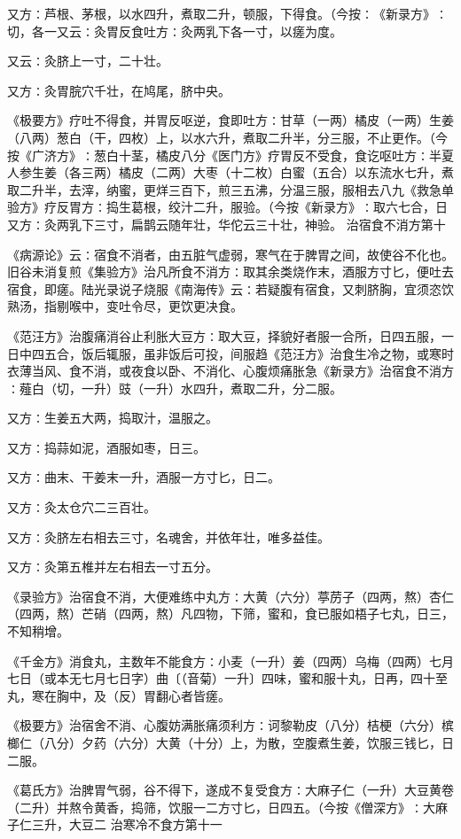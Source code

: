 \documentclass[a4paper,12pt,UTF8,twoside]{ctexbook}
\begin{document}
又方∶芦根、茅根，以水四升，煮取二升，顿服，下得食。（今按∶《新录方》∶切，各一又云∶灸胃反食吐方∶灸两乳下各一寸，以瘥为度。

又云∶灸脐上一寸，二十壮。

又方∶灸胃脘穴千壮，在鸠尾，脐中央。

《极要方》疗吐不得食，并胃反呕逆，食即吐方∶甘草（一两）橘皮（一两）生姜（八两）葱白（干，四枚）上，以水六升，煮取二升半，分三服，不止更作。（今按《广济方》∶葱白十茎，橘皮八分《医门方》疗胃反不受食，食讫呕吐方∶半夏人参生姜（各三两）橘皮（二两）大枣（十二枚）白蜜（五合）以东流水七升，煮取二升半，去滓，纳蜜，更烊三百下，煎三五沸，分温三服，服相去八九《救急单验方》疗反胃方∶捣生葛根，绞汁二升，服验。（今按《新录方》∶取六七合，日又方∶灸两乳下三寸，扁鹊云随年壮，华佗云三十壮，神验。
治宿食不消方第十

《病源论》云∶宿食不消者，由五脏气虚弱，寒气在于脾胃之间，故使谷不化也。旧谷未消复煎《集验方》治凡所食不消方∶取其余类烧作末，酒服方寸匕，便吐去宿食，即瘥。陆光录说子烧服《南海传》云∶若疑腹有宿食，又刺脐胸，宜须恣饮熟汤，指剔喉中，变吐令尽，更饮更决食。

《范汪方》治腹痛消谷止利胀大豆方∶取大豆，择貌好者服一合所，日四五服，一日中四五合，饭后辄服，虽非饭后可投，间服趋《范汪方》治食生冷之物，或寒时衣薄当风、食不消，或夜食以卧、不消化、心腹烦痛胀急《新录方》治宿食不消方∶薤白（切，一升）豉（一升）水四升，煮取二升，分二服。

又方∶生姜五大两，捣取汁，温服之。

又方∶捣蒜如泥，酒服如枣，日三。

又方∶曲末、干姜末一升，酒服一方寸匕，日二。

又方∶灸太仓穴二三百壮。

又方∶灸脐左右相去三寸，名魂舍，并依年壮，唯多益佳。

又方∶灸第五椎并左右相去一寸五分。

《录验方》治宿食不消，大便难练中丸方∶大黄（六分）葶苈子（四两，熬）杏仁（四两，熬）芒硝（四两，熬）凡四物，下筛，蜜和，食已服如梧子七丸，日三，不知稍增。

《千金方》消食丸，主数年不能食方∶小麦（一升）姜（四两）乌梅（四两）七月七日（或本无七月七日字）曲〔（音菊）一升〕四味，蜜和服十丸，日再，四十至丸，寒在胸中，及（反）胃翻心者皆瘥。

《极要方》治宿舍不消、心腹妨满胀痛须利方∶诃黎勒皮（八分）桔梗（六分）槟榔仁（八分）夕药（六分）大黄（十分）上，为散，空腹煮生姜，饮服三钱匕，日二服。

《葛氏方》治脾胃气弱，谷不得下，遂成不复受食方∶大麻子仁（一升）大豆黄卷（二升）并熬令黄香，捣筛，饮服一二方寸匕，日四五。（今按《僧深方》∶大麻子仁三升，大豆二
治寒冷不食方第十一
\end{document}

